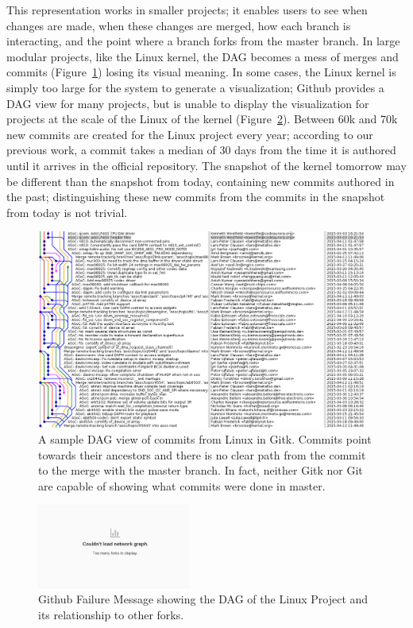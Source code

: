 \documentclass[conference, draftclsnofoot, draft]{IEEEtran}
\begin{document}
This representation works in smaller projects; it enables users to see when changes
are made, when these changes are merged, how each branch is interacting, and the
point where a branch forks from the master branch. In large modular projects, like
the Linux kernel, the DAG becomes a mess of merges and commits
(Figure~\ref{fig:gitk}) losing its visual meaning. In some cases, the Linux kernel
is simply too large for the system to generate a visualization; Github provides a
DAG view for many projects, but is unable to display the visualization for projects
at the scale of the Linux of the kernel (Figure~\ref{fig:gitfail}).  Between 60k and
70k new commits are created for the Linux project every year; according to our
previous work\cite{German2015}, a commit takes a median of 30 days from the time it
is authored until it arrives in the official repository. The snapshot of the kernel
tomorrow may be different than the snapshot from today, containing new commits
authored in the past; distinguishing these new commits from the commits in the
snapshot from today is not trivial.

\begin{figure}
        \centering
        \includegraphics[width=0.97\textwidth]{figures/gitk.png}
        \caption{A sample DAG view of commits from Linux in Gitk. Commits point
                towards their ancestors and there is no clear path from the commit
                to the merge with the master branch. In fact, neither Gitk nor Git
                are capable of showing what commits were done in master.}
        \label{fig:gitk}
\end{figure}

\begin{figure}
        \centering
        \includegraphics[width=0.45\textwidth]{figures/github_viewer.png}
        \caption{Github Failure Message showing the DAG of the Linux Project and its
                relationship to other forks.}
        \label{fig:gitfail}
\end{figure}
\end{document}
